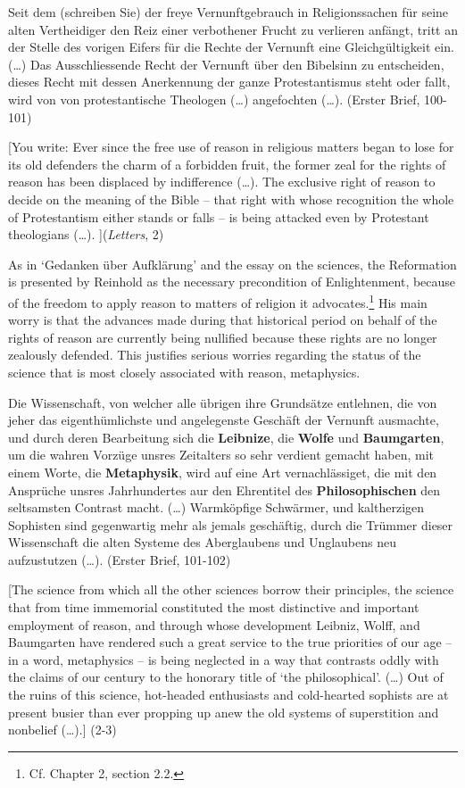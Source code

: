 Seit dem (schreiben Sie) der freye Vernunftgebrauch in Religionssachen f\"{u}r seine alten Vertheidiger den Reiz einer verbothener Frucht zu verlieren anf\"{a}ngt, tritt an der Stelle des vorigen Eifers f\"{u}r die Rechte der Vernunft eine Gleichg\"{u}ltigkeit ein. (\ldots ) Das Ausschliessende Recht der Vernunft \"{u}ber den Bibelsinn zu entscheiden, dieses Recht mit dessen Anerkennung der ganze Protestantismus steht oder fallt, wird von von protestantische Theologen (\ldots  ) angefochten (\ldots ). (Erster Brief, 100{-}101)

[You write: Ever since the free use of reason in religious matters began to lose for its old defenders the charm of a forbidden fruit, the former zeal for the rights of reason has been displaced by indifference (\ldots ). The exclusive right of reason to decide on the meaning of the Bible {--} that right with whose recognition the whole of Protestantism either stands or falls {--} is being attacked even by Protestant theologians (\ldots ). ](\textit{Letters}, 2)

As in `Gedanken \"{u}ber Aufkl\"{a}rung' and the essay on the sciences, the Reformation is presented by Reinhold as the necessary precondition of Enlightenment, because of the freedom to apply reason to matters of religion it advocates.\footnote{ Cf. Chapter 2, section 2.2. } His main worry is that the advances made during that historical period on behalf of the rights of reason are currently being nullified because these rights are no longer zealously defended. This justifies serious worries regarding the status of the science that is most closely associated with reason, metaphysics. 

Die Wissenschaft, von welcher alle \"{u}brigen ihre Grunds\"{a}tze entlehnen, die von jeher das eigenth\"{u}mlichste und angelegenste Gesch\"{a}ft der Vernunft ausmachte, und durch deren Bearbeitung sich die \textbf{Leibnize}, die \textbf{Wolfe} und \textbf{Baumgarten}, um die wahren Vorz\"{u}ge unsres Zeitalters so sehr verdient gemacht haben, mit einem Worte, die \textbf{Metaphysik}, wird auf eine Art vernachl\"{a}ssiget, die mit den Anspr\"{u}che unsres Jahrhundertes aur den Ehrentitel des \textbf{Philosophischen} den seltsamsten Contrast macht. (\ldots ) Warmk\"{o}pfige Schw\"{a}rmer, und kaltherzigen Sophisten sind gegenwartig mehr als jemals gesch\"{a}ftig, durch die Tr\"{u}mmer dieser Wissenschaft die alten Systeme des Aberglaubens und Unglaubens neu aufzustutzen (\ldots ). (Erster Brief, 101{-}102)

[The science from which all the other sciences borrow their principles, the science that from time immemorial constituted the most distinctive and important employment of reason, and through whose development Leibniz, Wolff, and Baumgarten have rendered such a great service to the true priorities of our age {--} in a word, metaphysics {--} is being neglected in a way that contrasts oddly with the claims of our century to the honorary title of `the philosophical'. (\ldots ) Out of the ruins of this science, hot{-}headed enthusiasts and cold{-}hearted sophists are at present busier than ever propping up anew the old systems of superstition and nonbelief (\ldots ).] (2{-}3)

